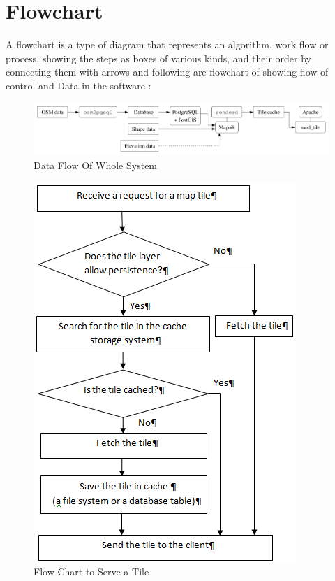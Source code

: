 \section{Flowchart}
A flowchart is a type of diagram that represents an algorithm, work flow or process, showing the steps as boxes of various kinds, and their order by connecting them with arrows
and following are flowchart of showing flow of control and Data in the software-:

\begin{figure}[h!]
	\centering
	\includegraphics[scale=0.6]{input/images/osmserv.png}
	\caption{Data Flow Of Whole System}
\end{figure}



\begin{figure}[h!]
\centering
\includegraphics[scale=0.9]{input/images/fetch.jpg}
\caption{Flow Chart to Serve a Tile}
\end{figure}
\hspace{-1.7em}



